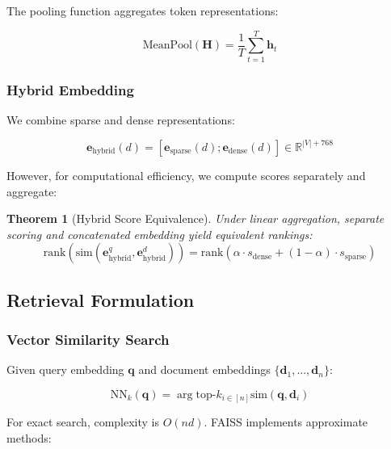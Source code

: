 \documentclass[11pt,a4paper]{article}
\newtheorem{theorem}{Theorem}
\newcommand{\simfunc}{\text{sim}}
\begin{document}
The pooling function aggregates token representations:

\begin{equation}
\text{MeanPool}(\mathbf{H}) = \frac{1}{T} \sum_{t=1}^{T} \mathbf{h}_t
\end{equation}

\subsubsection{Hybrid Embedding}

We combine sparse and dense representations:

\begin{equation}
\mathbf{e}_{\text{hybrid}}(d) = \left[\mathbf{e}_{\text{sparse}}(d); \mathbf{e}_{\text{dense}}(d)\right] \in \mathbb{R}^{|V| + 768}
\end{equation}

However, for computational efficiency, we compute scores separately and aggregate:

\begin{theorem}[Hybrid Score Equivalence]
Under linear aggregation, separate scoring and concatenated embedding yield equivalent rankings:
\begin{equation}
\text{rank}\left(\simfunc(\mathbf{e}_{\text{hybrid}}^q, \mathbf{e}_{\text{hybrid}}^d)\right) = \text{rank}\left(\alpha \cdot s_{\text{dense}} + (1-\alpha) \cdot s_{\text{sparse}}\right)
\end{equation}
\end{theorem}

\subsection{Retrieval Formulation}

\subsubsection{Vector Similarity Search}

Given query embedding $\mathbf{q}$ and document embeddings $\{\mathbf{d}_1, ..., \mathbf{d}_n\}$:

\begin{equation}
\text{NN}_k(\mathbf{q}) = \arg\text{top-}k_{i \in [n]} \simfunc(\mathbf{q}, \mathbf{d}_i)
\end{equation}

For exact search, complexity is $O(nd)$. FAISS implements approximate methods:
\end{document}

